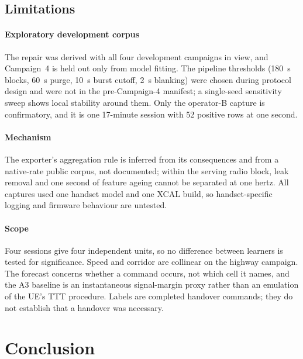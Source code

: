 \documentclass[5p,times,twocolumn]{elsarticle}
\begin{document}
\subsection{Limitations}
\paragraph{Exploratory development corpus} The repair was derived with all four development campaigns in view, and Campaign~4 is held out only from model fitting. The pipeline thresholds (180~s blocks, 60~s purge, 10~s burst cutoff, 2~s blanking) were chosen during protocol design and were not in the pre-Campaign-4 manifest; a single-seed sensitivity sweep shows local stability around them. Only the operator-B capture is confirmatory, and it is one 17-minute session with 52 positive rows at one second.

\paragraph{Mechanism} The exporter's aggregation rule is inferred from its consequences and from a native-rate public corpus, not documented; within the serving radio block, leak removal and one second of feature ageing cannot be separated at one hertz. All captures used one handset model and one XCAL build, so handset-specific logging and firmware behaviour are untested.

\paragraph{Scope} Four sessions give four independent units, so no difference between learners is tested for significance. Speed and corridor are collinear on the highway campaign. The forecast concerns whether a command occurs, not which cell it names, and the A3 baseline is an instantaneous signal-margin proxy rather than an emulation of the UE's TTT procedure. Labels are completed handover commands; they do not establish that a handover was necessary.

\section{Conclusion}
\label{sec:conclusion}
\end{document}
